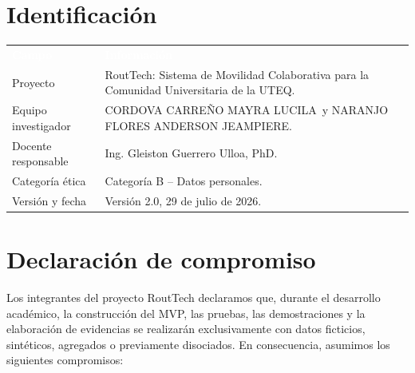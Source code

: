 \documentclass[10pt,a4paper]{article}
\newcommand{\Proyecto}{RoutTech: Sistema de Movilidad Colaborativa para la Comunidad Universitaria de la UTEQ}
\newcommand{\CategoriaEtica}{Categoría B -- Datos personales}
\newcommand{\FechaDocumento}{29 de julio de 2026}
\newcommand{\VersionDocumento}{2.0}
\newcommand{\Mayra}{CORDOVA CARREÑO MAYRA LUCILA}
\newcommand{\Anderson}{NARANJO FLORES ANDERSON JEAMPIERE}
\newcommand{\Docente}{Ing. Gleiston Guerrero Ulloa, PhD}
\begin{document}
\section{Identificación}

\noindent\begin{tabularx}{\textwidth}{L{4.5cm} Y}
\textcolor{white}{\textbf{Campo}} & \textcolor{white}{\textbf{Información}}\\
Proyecto & \Proyecto.\\
Equipo investigador & \Mayra\ y \Anderson.\\
Docente responsable & \Docente.\\
Categoría ética & \CategoriaEtica.\\
Versión y fecha & Versión \VersionDocumento, \FechaDocumento.\\
\end{tabularx}

\section{Declaración de compromiso}

Los integrantes del proyecto RoutTech declaramos que, durante el desarrollo académico, la construcción del MVP, las pruebas, las demostraciones y la elaboración de evidencias se realizarán exclusivamente con datos ficticios, sintéticos, agregados o previamente disociados. En consecuencia, asumimos los siguientes compromisos:
\end{document}

